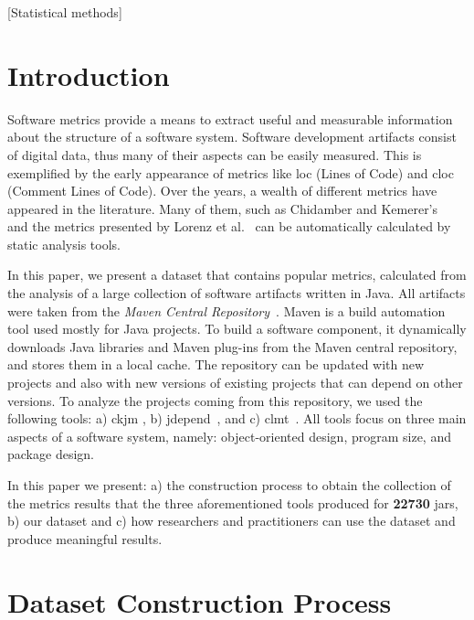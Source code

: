 \documentclass{sig-alternate}
\begin{document}
[Statistical methods]



\section{Introduction}
\label{sec:intro}

Software metrics provide a means to extract useful and measurable information about the structure of a software system. Software development artifacts consist of digital data, thus many of their aspects can be easily measured. This is exemplified by the early appearance of metrics like {\sc loc} (Lines of Code) and {\sc cloc} (Comment Lines of Code). Over the years, a wealth of different metrics have appeared in the literature. Many of them, such as Chidamber and Kemerer's~\cite{CHKE94} and the metrics presented by Lorenz et al.~\cite{LOKI94} can be automatically calculated by static analysis tools.

In this paper, we present a dataset that contains popular metrics, calculated from the analysis of a large collection of software artifacts written in Java. All artifacts were taken from the {\it Maven Central Repository}~\cite{MAVEN}. Maven is a build automation tool used mostly for Java projects. To build a software component, it dynamically downloads Java libraries and Maven plug-ins from the Maven central repository, and stores them in a local cache. The repository can be updated with new projects and also with new versions of existing projects that can depend on other versions. To analyze the projects coming from this repository, we used the following tools: a) {\sc ckjm} \cite{Spi05g}, b) {\sc jd}epend~\cite{JDEPEND}, and c) {\sc clmt}~\cite{SGKL09}. All tools focus on three main aspects of a software system, namely: object-oriented design, program size, and package design.

In this paper we present: a) the construction process to obtain the collection of the metrics results that the three aforementioned tools produced for {\bf 22730} {\sc jar}s, b) our dataset and c) how researchers and practitioners can use the dataset and produce meaningful results.

\section{Dataset Construction Process}
\label{sec:data}
\end{document}
